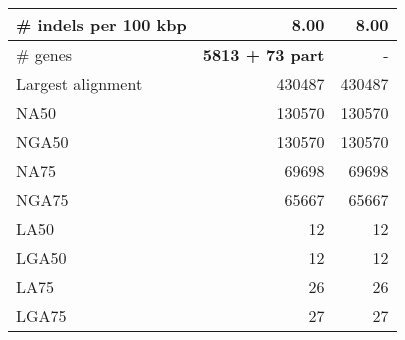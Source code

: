 \documentclass[12pt,a4paper]{article}
\begin{document}
\begin{table}[ht]
\begin{center}
\begin{tabular}{|l*{2}{|r}|}
\# indels per 100 kbp & 8.00 & 8.00 \\ \hline
\# genes & {\bf 5813 + 73 part} & - \\ \hline
Largest alignment & 430487 & 430487 \\ \hline
NA50 & 130570 & 130570 \\ \hline
NGA50 & 130570 & 130570 \\ \hline
NA75 & 69698 & 69698 \\ \hline
NGA75 & 65667 & 65667 \\ \hline
LA50 & 12 & 12 \\ \hline
LGA50 & 12 & 12 \\ \hline
LA75 & 26 & 26 \\ \hline
LGA75 & 27 & 27 \\ \hline
\end{tabular}
\end{center}
\end{table}
\end{document}
